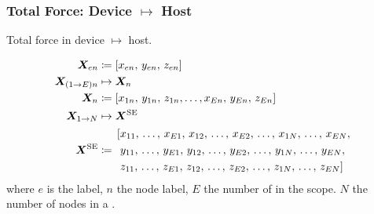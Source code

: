 \subsubsection{Total Force: Device $ \mapsto $ Host}
\begin{algorithm}
	\caption{Total force in device $ \mapsto $ host.}
	\begin{algorithmic}[1]
		 
		 
		 
		\EndFor
		\EndFor
		\EndFunction
	\end{algorithmic}
\end{algorithm}
\begin{subequations}\label{eq:fcne}
	\begin{align}
		\vec{X}_{en}          & \coloneqq	\left[x_{en},\, y_{en},\, z_{en}\right]                                                     \\
		\vec{X}_{(1\to E)n}   & \mapsto 	\vec{X}_{n} \nn
		\vec{X}_{n}           & \coloneqq	\left[x_{1n},\, y_{1n},\, z_{1n},\ldots,x_{En},\, y_{En},\, z_{En}\right]\label{seq:xn_arr} \\
		\vec{X}_{1\to N}      & \mapsto	\vec{X}^{\textrm{SE}}\nn
		\vec{X}^{\textrm{SE}} & \coloneqq
		\begin{aligned}
			 & \left[x_{11},\, \ldots,\, x_{E1},\, x_{12},\, \ldots,\, x_{E2},\, \ldots,\, x_{1N},\, \ldots,\, x_{EN}, \right.   \\
			 & \left.\,y_{11},\, \ldots,\, y_{E1},\, y_{12},\, \ldots,\, y_{E2},\, \ldots,\, y_{1N},\, \ldots,\, y_{EN}, \right. \\
			 & \left.\,z_{11},\, \ldots,\, z_{E1},\, z_{12},\, \ldots,\, z_{E2},\, \ldots,\, z_{1N},\, \ldots,\, z_{EN}  \right]
		\end{aligned}
	\end{align}
\end{subequations}
where $ e $ is the  label, $ n $ the node label, $ E $ the number of  in the scope. $ N $ the number of nodes in a .


